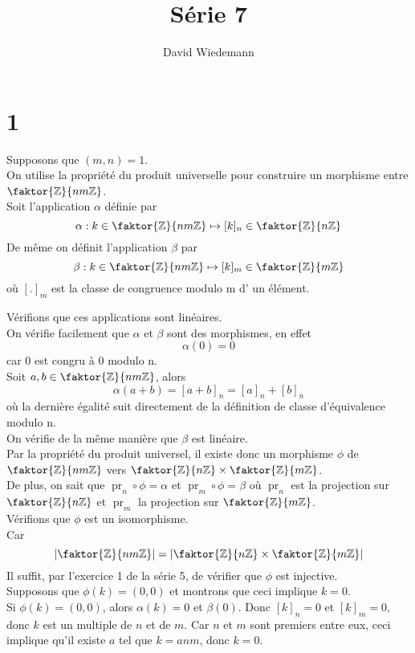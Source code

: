 \documentclass[11pt, a4paper, twoside]{article}
\newcommand{\f}{\faktor}
\DeclareMathOperator*{\pr}{pr}
\begin{document}
\title{Série 7}
\author{David Wiedemann}
\maketitle
\section*{1}
Supposons que $( m,n) =1$.\\
On utilise la propriété du produit universelle pour construire un morphisme entre $\f { \mathbb{Z}} { nm \mathbb{Z}} $.\\
Soit l'application $\alpha$ définie par
\[ 
\alpha : k \in \f { \mathbb{Z}} { nm\mathbb{Z}} \mapsto [ k] _n \in \f { \mathbb{Z}} { n\mathbb{Z}} 
\]
De même on définit l'application $\beta$ par
\[ 
\beta : k \in \f { \mathbb{Z}} { nm\mathbb{Z}} \mapsto [ k] _m \in \f { \mathbb{Z}} { m\mathbb{Z}} 
\]
où $[.]_m$ est la classe de congruence modulo m d' un élément.

Vérifions que ces applications sont linéaires.\\
On vérifie facilement que $\alpha$ et $\beta$ sont des morphismes, en effet 
\[ 
	\alpha( 0) = 0
\]
car 0 est congru à 0 modulo n.\\
Soit $a,b \in \f { \mathbb{Z}} { nm\mathbb{Z}} $, alors
 \[ 
	 \alpha( a + b)  = [ a+b]_n = [ a]_n + [ b]_n
\]
où la dernière égalité suit directement de la définition de classe d'équivalence modulo n.\\
On vérifie de la même manière que $\beta$ est linéaire.\\
Par la propriété du produit universel, il existe donc un morphisme $\phi$ de $\f { \mathbb{Z} } { nm\mathbb{Z}} $ vers $\f { \mathbb{Z}} { n \mathbb{Z}} \times \f { \mathbb{Z}} { m \mathbb{Z}} $.\\

De plus, on sait que $\pr_n \circ \phi = \alpha$ et $\pr_m \circ \phi =\beta$ où $\pr_n$ est la projection sur $ \f { \mathbb{Z}} { n \mathbb{Z}}$ et $\pr_m  $ la projection sur $\f { \mathbb{Z}} { m \mathbb{Z}}$.\\

Vérifions que $\phi$ est un isomorphisme.\\
Car
\[
\left|\f { \mathbb{Z}} { nm \mathbb{Z}}\right| = \left|\f { \mathbb{Z}} { n \mathbb{Z}} \times\f { \mathbb{Z}} { m \mathbb{Z}}\right| 
\]
Il suffit, par l'exercice 1 de la série 5, de vérifier que $\phi$ est injective.\\

Supposons que $\phi( k) =( 0,0) $ et montrons que ceci implique $k=0$.\\
Si $\phi( k) = (0,0) $, alors $\alpha( k) = 0 $ et $\beta( 0) $.
Donc $[k]_n = 0$ et $[k]_m= 0$, donc $k$ est un multiple de $n$ et de $m$.
Car $n$ et $m$ sont premiers entre eux, ceci implique qu'il existe $a$ tel que $k= anm$, donc $k=0$.\\
\end{document}
